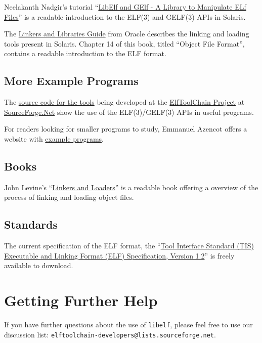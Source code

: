 \documentclass[a4paper,pdftex]{book}
\newcommand{\elftoolchainproject}{\href{https://elftoolchain.sourceforge.io/}%
    {ElfToolChain Project}\xspace}
\newcommand{\library}[1]{\texttt{#1}}
\newcommand{\reg}{\textregistered\xspace}
\newcommand{\trade}{\texttrademark\xspace}
\begin{document}
Neelakanth Nadgir's tutorial ``\href{%
https://web.archive.org/web/20110926220119/http://developers.sun.com/solaris/articles/elf.html%
}{LibElf and GElf - A Library to Manipulate ELf Files}'' is a readable
introduction to the ELF(3) and GELF(3) APIs in Solaris\trade.

The
\href{https://docs.oracle.com/cd/E53394_01/html/E54813/index.html}{Linkers
and Libraries Guide} from Oracle\reg describes the linking and
loading tools present in Solaris\trade.  Chapter 14 of this book,
titled ``Object File Format'', contains a readable introduction to the
ELF format.

\subsection{More Example Programs}

\index{libelf@\library{libelf}!additional examples}
The
\href{https://sourceforge.net/p/elftoolchain/code/HEAD/tree/trunk/}%
{source code for the tools} being developed at the
\elftoolchainproject at \href{https://sourceforge.net/}{SourceForge.Net}
show the use of the ELF(3)/GELF(3) APIs in useful programs.

For readers looking for smaller programs to study, Emmanuel Azencot
offers a website with
\href{http://freemanu1.free.fr/elf_examples/index.html}{example
  programs}.

\subsection{Books}

John Levine's
``\href{https://linker.iecc.com/}{Linkers and Loaders}'' is a readable
book offering a overview of the process of linking and loading object
files.

\subsection{Standards}

The current specification of the ELF
format, the ``\href{https://refspecs.linuxbase.org/elf/elf.pdf}%
{Tool Interface Standard (TIS) Executable and Linking Format
(ELF) Specification, Version 1.2}'' is freely available to download.

\section{Getting Further Help}

If you have further questions about
the use of \library{libelf}, please feel free to use our discussion
list: \texttt{elftoolchain-\-developers@lists.sourceforge.net}.

\backmatter

\printindex
\end{document}
